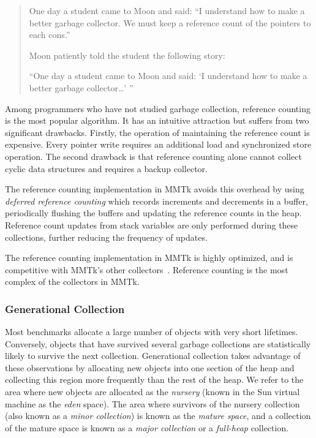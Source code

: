 \begin{quotation}
One day a student came to Moon and said: ``I understand how to make a better garbage collector. 
We must keep a reference count of the pointers to each cons.''

Moon patiently told the student the following story:

``One day a student came to Moon and said: `I understand how to make a better garbage collector\ldots' ''
\end{quotation}

Among programmers who have not studied garbage collection, reference counting is the most
popular algorithm.  It has an intuitive attraction but suffers from two significant drawbacks.
Firstly, the operation of maintaining the reference count is expensive.  Every pointer write
requires an additional load and synchronized store operation.  The second drawback
is that reference counting alone cannot collect cyclic data structures and requires
a backup collector.

The reference counting implementation in MMTk avoids this overhead by using
\emph{deferred reference counting} which records increments and decrements
in a buffer, periodically flushing the buffers and updating the reference counts
in the heap.  Reference count updates from stack variables are only performed
during these collections, further reducing the frequency of updates.

The reference counting implementation in MMTk is highly optimized, and is
competitive with MMTk's other collectors~\citep{SBF:12}.  Reference counting
is the most complex of the collectors in MMTk.

\subsubsection{Generational Collection}

Most benchmarks allocate a large number of objects with very short lifetimes.
Conversely, objects that have survived several garbage collections are statistically
likely to survive the next collection.  Generational collection takes advantage of
these observations by allocating new objects into one section of the heap and
collecting this region more frequently than the rest of the heap.  We refer to
the area where new objects are allocated as the \emph{nursery} (known in the Sun
virtual machine as the \emph{eden} space).  The area where survivors of the
nursery collection (also known as a \emph{minor collection}) is known as
the \emph{mature space}, and a collection of the mature space is known as
a \emph{major collection} or a \emph{full-heap} collection.

